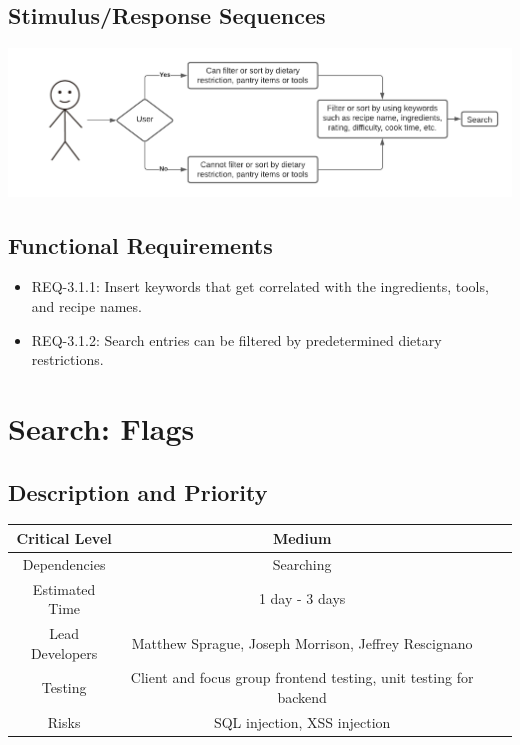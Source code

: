 \documentclass{scrreprt}
\begin{document}
\subsection{Stimulus/Response Sequences}

\includegraphics{FlowCharts/Search-Search.png}

\subsection{Functional Requirements}

\begin{itemize}
    \item REQ-3.1.1: Insert keywords that get correlated with the ingredients, tools, and recipe names.
    \item REQ-3.1.2: Search entries can be filtered by predetermined dietary restrictions.
\end{itemize}

\section{Search: Flags}

\subsection{Description and Priority}
\begin{center}
    \begin{tabular}{| c | c | c | c |}
        \hline
        Critical Level & Medium \\
        \hline
        Dependencies & Searching \\
        \hline
        Estimated Time & 1 day - 3 days \\
        \hline
        Lead Developers & Matthew Sprague, Joseph Morrison, Jeffrey Rescignano \\
        \hline
        Testing & Client and focus group frontend testing, unit testing for backend \\
        \hline
        Risks & SQL injection, XSS injection \\
        \hline
    \end{tabular}
\end{center}
\end{document}
